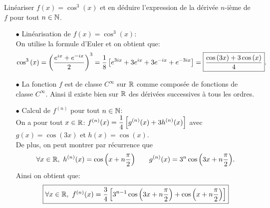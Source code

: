 \documentclass[a4paper, 11pt,reqno]{article}
\begin{document}
\begin{correction}  \;
	Lin\'eariser $f(x)=\cos^3{(x)}$ et en d\'eduire l'expression de la d\'eriv\'ee $n$-i\`{e}me de $f$ pour tout $n\in\mathbb{N}$.
	\begin{itemize}
		\item[$\bullet$] Lin\'earisation de $f(x)=\cos^3{(x)}$:\\
		      \noindent On utilise la formule d'Euler et on obtient que:
		      $$\cos^3{(x)}=\left( \displaystyle\frac{e^{ix} +e^{-ix} }{2}  \right)^3=
			      \displaystyle\frac{1}{8}\left\lbrack
			      e^{3ix}+3e^{ix}+3e^{-ix}+e^{-3ix}
			      \right\rbrack=\fbox{$\displaystyle\frac{\cos{(3x)} +3 \cos{(x)}}{4}$}
			      .$$
		\item[$\bullet$] La fonction $f$ est de classe $C^{\infty}$ sur $\mathbb{R}$ comme compos\'ee de fonctions de classe $C^{\infty}$. Ainsi il existe bien sur $\mathbb{R}$ des d\'eriv\'ees successives \`{a} tous les ordres.
		\item[$\bullet$] Calcul de $f^{(n)}$ pour tout $n\in\mathbb{N}$:\\
		      On a pour tout $x\in\mathbb{R}$: $f^{(n)}(x)=\displaystyle\frac{1}{4}\left\lbrack g^{(n)}(x)+3h^{(n)}(x)\right\rbrack$ avec $g(x)=\cos{(3x)}$ et $h(x)=\cos{(x)}$.\\
		      \noindent De plus, on peut montrer par r\'ecurrence que
		      $$\forall x\in\mathbb{R},\ h^{(n)}(x)=\cos{\left( x+n\displaystyle\frac{\pi}{2} \right)}\qquad g^{(n)}(x)=3^n \cos{\left( 3x+n\displaystyle\frac{\pi}{2} \right)}  .$$
		      Ainsi on obtient que:
		      $$\fbox{$\forall x\in\R,\ f^{(n)}(x)=\ddp\frac{3}{4}\left\lbrack 3^{n-1} \cos{\left( 3x+n\ddp\frac{\pi}{2} \right)}+ \cos{\left( x+n\ddp\frac{\pi}{2} \right)} \right\rbrack$}$$

	\end{itemize}
\end{correction}
\end{document}
